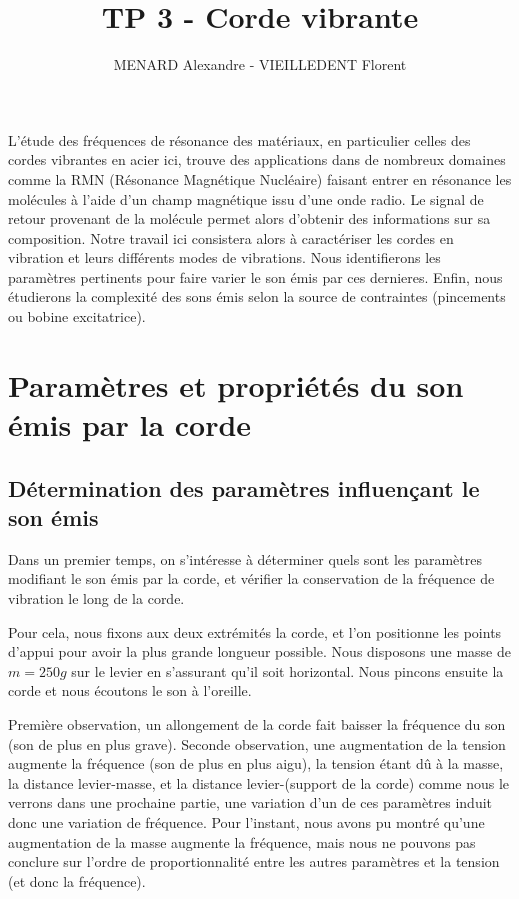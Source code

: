\documentclass[11pt]{article}
\title{\vspace{-2cm}\textbf{TP 3 - Corde vibrante}}
\author{\vspace{-0.5cm}MENARD Alexandre - VIEILLEDENT Florent}
\date{\vspace{-0.7cm}}
\begin{document}
\maketitle

L'étude des fréquences de résonance des matériaux, en particulier celles des cordes vibrantes en acier ici, trouve des applications dans de nombreux domaines 
comme la RMN (Résonance Magnétique Nucléaire) faisant entrer en résonance les molécules à l'aide d'un champ magnétique issu d'une onde radio. Le signal de retour provenant
de la molécule permet alors d'obtenir des informations sur sa composition. 
Notre travail ici consistera alors à caractériser les cordes en vibration et leurs différents modes de vibrations. Nous identifierons les paramètres pertinents pour faire
varier le son émis par ces dernieres. Enfin, nous étudierons la complexité des sons émis selon la source de contraintes (pincements ou bobine excitatrice).

\section{Paramètres et propriétés du son émis par la corde}
\subsection{Détermination des paramètres influençant le son émis}

Dans un premier temps, on s'intéresse à déterminer quels sont les paramètres modifiant le son émis par la corde, et vérifier la conservation de la fréquence 
de vibration le long de la corde.

Pour cela, nous fixons aux deux extrémités la corde, et l'on positionne les points d'appui pour avoir la plus grande longueur possible. Nous disposons une masse de $m=250g$ sur le levier
en s'assurant qu'il soit horizontal. Nous pincons ensuite la corde et nous écoutons le son à l'oreille.

Première observation, un allongement de la corde fait baisser la fréquence du son (son de plus en plus grave). 
Seconde observation, une augmentation de la tension augmente la fréquence (son de plus en plus aigu), la tension étant dû à la masse, la distance levier-masse, et la distance
levier-(support de la corde) comme nous le verrons dans une prochaine partie, une variation d'un de ces paramètres induit donc une variation de fréquence. Pour l'instant, 
nous avons pu montré qu'une augmentation de la masse augmente la fréquence, mais nous ne pouvons pas conclure sur l'ordre de proportionnalité entre les autres paramètres et la tension (et donc la fréquence).
\end{document}

